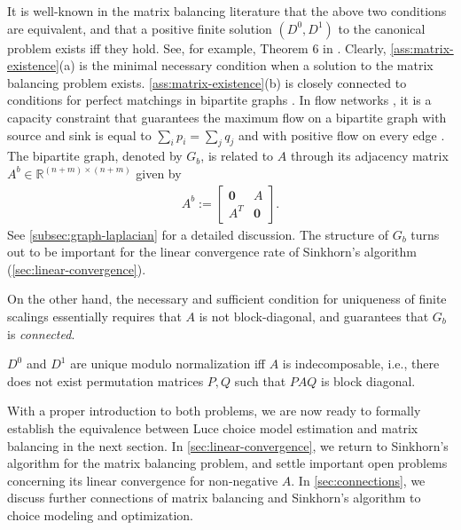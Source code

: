 It is well-known in the matrix balancing literature that the above two conditions are equivalent, and that a positive finite solution $(D^{0},D^{1})$ to the canonical problem exists iff they hold. See, for example, Theorem 6 in \citet{pukelsheim2009iterative}. Clearly, \cref{ass:matrix-existence}(a) is the minimal necessary condition when a solution to the matrix balancing problem exists. \cref{ass:matrix-existence}(b) is closely connected to conditions for perfect matchings in bipartite graphs \citep{hall1935representatives}. In flow networks \citep{gale1957theorem,ford1956maximal,ford1957simple}, it is a capacity constraint that
guarantees the maximum flow on a bipartite graph with source and sink is equal to $\sum_i p_i=\sum_j q_j$ and with positive flow on every edge \citep{idel2016review}.  The bipartite graph, denoted by $G_b$, is related to $A$ through its  adjacency matrix $A^b \in \mathbb{R}^{(n+m)\times(n+m)}$ given by
\begin{align*}
    A^b := \begin{bmatrix}\mathbf{0} & {A}\\
{A}^{T} & \mathbf{0}
\end{bmatrix}.	
\end{align*}
See \cref{subsec:graph-laplacian} for a detailed discussion. The structure of $G_b$ turns out to be important for the linear convergence rate of Sinkhorn's algorithm (\cref{sec:linear-convergence}).

On the other hand, the necessary and sufficient condition for uniqueness of finite scalings essentially requires that $A$ is not block-diagonal, and guarantees that $G_b$ is \emph{connected}.
\begin{assumption}
\label{ass:matrix-uniqueness}
 $D^{0}$ and $D^{1}$ are unique modulo normalization iff $A$ is indecomposable, i.e., there does not exist permutation matrices $P,Q$ such that $PAQ$ is block diagonal.
\end{assumption} 
 
With a proper introduction to both problems, we are now ready to formally establish the equivalence between Luce choice model estimation and matrix balancing in the next section. In \cref{sec:linear-convergence}, we return to Sinkhorn's algorithm for the matrix balancing problem, and settle important open problems concerning its linear convergence for non-negative $A$.  In \cref{sec:connections}, we discuss further connections of matrix balancing and Sinkhorn's algorithm to choice modeling and optimization.